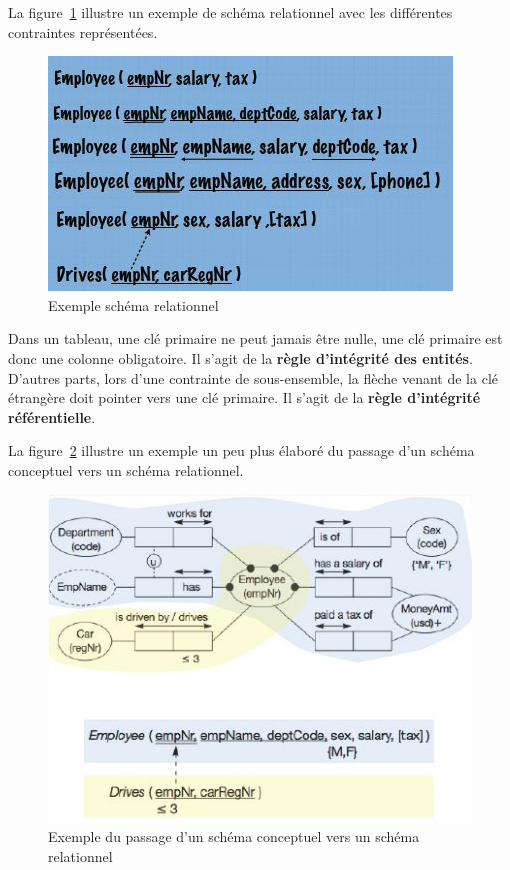 La figure~\ref{schema_relationnel} illustre un exemple de schéma relationnel
avec les différentes contraintes représentées.
\begin{figure}[h]
  \centering
  \includegraphics[scale=0.9]{schema_relationnel.jpg}
  \caption{Exemple schéma relationnel}
  \label{schema_relationnel}
\end{figure}

Dans un tableau, une clé primaire ne peut jamais être nulle,
une clé primaire est donc une colonne obligatoire.
Il s'agit de la \textbf{règle d'intégrité des entités}.
D'autres parts, lors d'une contrainte de sous-ensemble,
la flèche venant de la clé étrangère doit pointer vers une clé primaire.
Il s'agit de la \textbf{règle d'intégrité référentielle}.

La figure~\ref{conceptuel_to_relationnel} illustre un exemple un peu plus
élaboré du passage d'un schéma conceptuel vers un schéma relationnel.
\begin{figure}[ht]
  \centering
  \includegraphics[scale=1]{conceptuel_to_relationnel.jpg}
  \caption{Exemple du passage d'un schéma conceptuel vers un schéma relationnel}
  \label{conceptuel_to_relationnel}
\end{figure}


